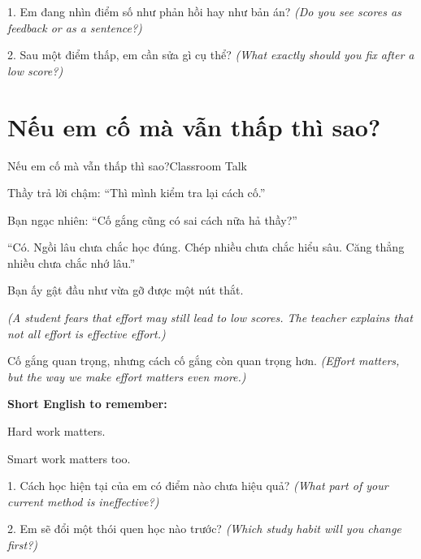 \begin{tuhocnhanh}
1. Em đang nhìn điểm số như phản hồi hay như bản án? \textit{(Do you see scores as feedback or as a sentence?)}

2. Sau một điểm thấp, em cần sửa gì cụ thể? \textit{(What exactly should you fix after a low score?)}
\end{tuhocnhanh}
\ngancach

\section{Nếu em cố mà vẫn thấp thì sao?}
\begin{truyen}{Nếu em cố mà vẫn thấp thì sao?}{Classroom Talk}

Thầy trả lời chậm: ``Thì mình kiểm tra lại cách cố.''

Bạn ngạc nhiên: ``Cố gắng cũng có sai cách nữa hả thầy?''

``Có. Ngồi lâu chưa chắc học đúng. Chép nhiều chưa chắc hiểu sâu. Căng thẳng nhiều chưa chắc nhớ lâu.''

Bạn ấy gật đầu như vừa gỡ được một nút thắt.

\textit{(A student fears that effort may still lead to low scores. The teacher explains that not all effort is effective effort.)}
\end{truyen}

\begin{baihoc}
Cố gắng quan trọng, nhưng cách cố gắng còn quan trọng hơn.
\textit{(Effort matters, but the way we make effort matters even more.)}
\end{baihoc}

\begin{ghinhoanh}
\textbf{Short English to remember:}

Hard work matters.

Smart work matters too.
\end{ghinhoanh}

\begin{tuhocnhanh}
1. Cách học hiện tại của em có điểm nào chưa hiệu quả? \textit{(What part of your current method is ineffective?)}

2. Em sẽ đổi một thói quen học nào trước? \textit{(Which study habit will you change first?)}
\end{tuhocnhanh}
\ngancach


